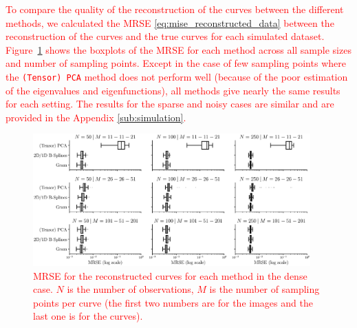 \begin{results}
\textcolor{red}{To compare the quality of the reconstruction of the curves between the different methods, we calculated the MRSE \eqref{eq:mise_reconstructed_data} between the reconstruction of the curves and the true curves for each simulated dataset. Figure~\ref{fig:mise_mfd_1d} shows the boxplots of the MRSE for each method across all sample sizes and number of sampling points. Except in the case of few sampling points where the \texttt{(Tensor) PCA} method does not perform well (because of the poor estimation of the eigenvalues and eigenfunctions), all methods give nearly the same results for each setting. The results for the sparse and noisy cases are similar and are provided in the Appendix \ref{sub:simulation}.}
\begin{figure}
     \centering
     \includegraphics[width=0.95\textwidth]{figures/MRSE.eps}
    \caption{\textcolor{red}{MRSE for the reconstructed curves for each method in the dense case. $N$ is the number of observations, $M$ is the number of sampling points per curve (the first two numbers are for the images and the last one is for the curves).}}
    \label{fig:mise_mfd_1d}
\end{figure}
\end{results}




